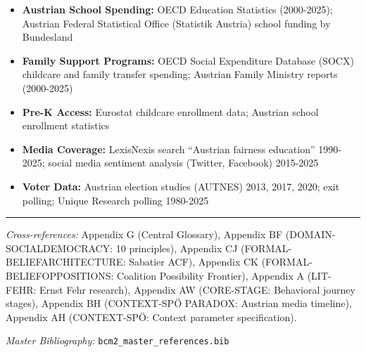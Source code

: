 \begin{itemize}[nosep]
\item \textbf{Austrian School Spending:} OECD Education Statistics (2000-2025); Austrian Federal
Statistical Office (Statistik Austria) school funding by Bundesland

\item \textbf{Family Support Programs:} OECD Social Expenditure Database (SOCX) childcare and family
transfer spending; Austrian Family Ministry reports (2000-2025)

\item \textbf{Pre-K Access:} Eurostat childcare enrollment data; Austrian school enrollment statistics

\item \textbf{Media Coverage:} LexisNexis search ``Austrian fairness education'' 1990-2025;
social media sentiment analysis (Twitter, Facebook) 2015-2025

\item \textbf{Voter Data:} Austrian election studies (AUTNES) 2013, 2017, 2020; exit polling;
Unique Research polling 1980-2025

\end{itemize}


\vspace{1em}
\hrule
\vspace{0.5em}

\noindent\textit{Cross-references:}
Appendix G (Central Glossary),
Appendix BF (DOMAIN-SOCIALDEMOCRACY: 10 principles),
Appendix CJ (FORMAL-BELIEFARCHITECTURE: Sabatier ACF),
Appendix CK (FORMAL-BELIEFOPPOSITIONS: Coalition Possibility Frontier),
Appendix A (LIT-FEHR: Ernst Fehr research),
Appendix AW (CORE-STAGE: Behavioral journey stages),
Appendix BH (CONTEXT-SPÖ PARADOX: Austrian media timeline),
Appendix AH (CONTEXT-SPÖ: Context parameter specification).

\noindent\textit{Master Bibliography:} \texttt{bcm2\_master\_references.bib}

